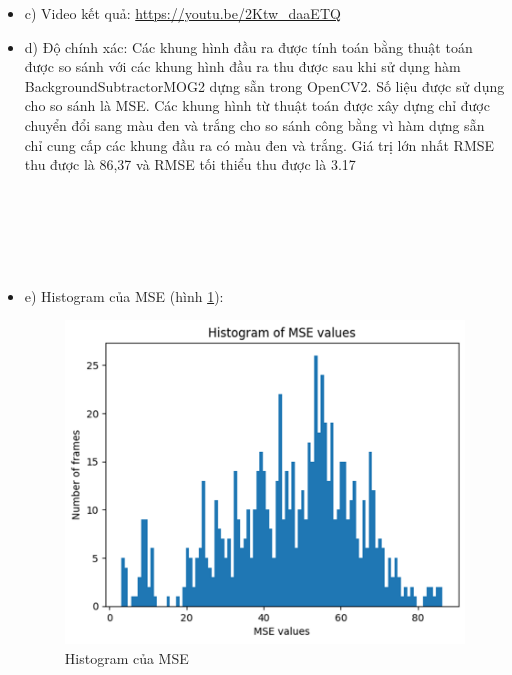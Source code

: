 \documentclass[a4paper]{article}
\begin{document}
\begin{itemize}[label={}]
    \item c) Video kết quả: \url{https://youtu.be/2Ktw_daaETQ}
    \item d)  Độ chính xác: Các khung hình đầu ra được tính toán bằng thuật toán được so sánh với các khung hình đầu ra thu được sau khi sử dụng hàm BackgroundSubtractorMOG2 dựng sẵn trong OpenCV2. Số liệu được sử dụng cho so sánh là MSE\cite{mean_squared_error}. Các khung hình từ thuật toán được xây dựng chỉ được chuyển đổi sang màu đen và trắng cho so sánh công bằng vì hàm dựng sẵn chỉ cung cấp các khung đầu ra có màu đen và trắng. Giá trị lớn nhất RMSE thu được là 86,37 và RMSE tối thiểu thu được là 3.17
    \\ \\ \\ \\ \\ \\ 
    \item e) Histogram của MSE (hình \ref{fig:mse}):
    \begin{figure}
        \centering
        \includegraphics[width=1\linewidth]{images//result/mse.png}
        \caption{Histogram của MSE}
        \label{fig:mse}
    \end{figure}
    

\end{itemize}
\end{document}
